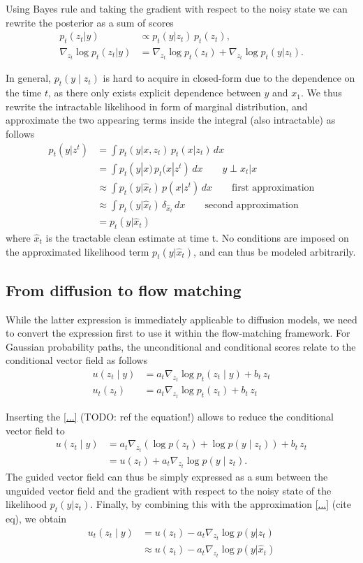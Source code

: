 Using Bayes rule and taking the gradient with respect to the noisy state we can rewrite the posterior as a sum of scores
\begin{align*}
p_t(z_t | y) &\propto p_t(y | z_t)\, p_t(z_t), \\
\nabla_{z_t}\log p_t(z_t | y) &= \nabla_{z_t}\log p_t(z_t) + \nabla_{z_t}\log p_t(y | z_t).
\end{align*}

In general, $p_t(y\mid z_t)$ is hard to acquire in closed-form due to the dependence on the time $t$, as there only exists explicit dependence between $y$ and $x_1$.
We thus rewrite the intractable likelihood in form of marginal distribution, 
and approximate the two appearing terms inside the integral (also intractable) as follows
\begin{align*}
    p_t(y | z^t) &= \int p_t(y | x, z_t)\, p_t(x | z_t)\, dx \\
    &= \int p_t(y | x)\, p_t(x | z^t)\, dx \qquad y \perp x_t | x \\
    &\approx \int p_t(y | \hat{x}_t)\, p(x | z^t)\, dx \qquad \text{first approximation} \\
    &\approx \int p_t(y | \hat{x}_t)\, \delta_{\hat{x}_t}\,dx \qquad \text{second approximation} \\
    &= p_t(y | \hat{x}_t)
\end{align*}
where $\hat{x}_t$ is the tractable clean estimate at time t.
No conditions are imposed on the approximated likelihood term $p_t(y | \hat{x}_t)$, and can thus be modeled arbitrarily.

\subsection{From diffusion to flow matching}
While the latter expression is immediately applicable to diffusion models, we need to convert the expression first to use it within the flow-matching framework.
For Gaussian probability paths, the unconditional and conditional scores relate to the conditional vector field as follows
\begin{align*}
u(z_t \mid y) &= a_t \nabla_{z_t} \log p_t(z_t\mid y) + b_t\,z_t \\
u_t(z_t) &= a_t \nabla_{z_t} \log p_t(z_t) + b_t\,z_t
\end{align*}

Inserting the \ref{...} (TODO: ref the equation!) allows to reduce the conditional vector field to
\begin{align*}
u(z_t \mid y) &= a_t \nabla_{z_t} (\log p(z_t) + \log p(y \mid z_t)) + b_t\,z_t \\
&= u(z_t) + a_t \nabla_{z_t} \log p(y \mid z_t) .
\end{align*}
The guided vector field can thus be simply expressed as a sum between the unguided vector field and the gradient with respect to the noisy state of the likelihood $p_t(y|z_t)$. 
Finally, by combining this with the approximation \ref{...} (cite eq), we obtain
\begin{align*}
    u_t(z_t \mid y) &= u(z_t) - a_t \nabla_{z_t} \log p(y|z_t) \\
    &\approx u(z_t) - a_t \nabla_{z_t} \log p(y|\hat{x}_t)
\end{align*}

